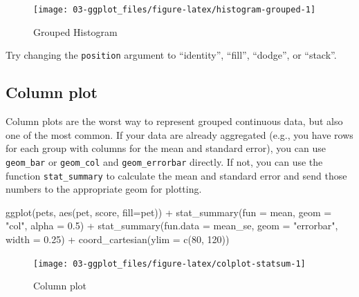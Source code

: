 \documentclass[
  oneside]{book}
\newenvironment{Shaded}{\begin{snugshade}}{\end{snugshade}}
\newcommand{\AttributeTok}[1]{\textcolor[rgb]{0.77,0.63,0.00}{#1}}
\newcommand{\DecValTok}[1]{\textcolor[rgb]{0.00,0.00,0.81}{#1}}
\newcommand{\FloatTok}[1]{\textcolor[rgb]{0.00,0.00,0.81}{#1}}
\newcommand{\FunctionTok}[1]{\textcolor[rgb]{0.00,0.00,0.00}{#1}}
\newcommand{\NormalTok}[1]{#1}
\newcommand{\SpecialCharTok}[1]{\textcolor[rgb]{0.00,0.00,0.00}{#1}}
\newcommand{\StringTok}[1]{\textcolor[rgb]{0.31,0.60,0.02}{#1}}
\begin{document}
\begin{figure}

{\centering \texttt{[image: 03-ggplot\_files/figure-latex/histogram-grouped-1]} 

}

\caption{Grouped Histogram}\label{fig:histogram-grouped}
\end{figure}

\begin{try}
Try changing the \texttt{position} argument to ``identity'', ``fill'', ``dodge'', or ``stack''.

\end{try}

\hypertarget{geom_col}{%
\subsection{Column plot}\label{geom_col}}

Column plots are the worst way to represent grouped continuous data, but also one of the most common. If your data are already aggregated (e.g., you have rows for each group with columns for the mean and standard error), you can use \texttt{geom\_bar} or \texttt{geom\_col} and \texttt{geom\_errorbar} directly. If not, you can use the function \texttt{stat\_summary} to calculate the mean and standard error and send those numbers to the appropriate geom for plotting.

\begin{Shaded}
\begin{Highlighting}[]
\FunctionTok{ggplot}\NormalTok{(pets, }\FunctionTok{aes}\NormalTok{(pet, score, }\AttributeTok{fill=}\NormalTok{pet)) }\SpecialCharTok{+}
  \FunctionTok{stat\_summary}\NormalTok{(}\AttributeTok{fun =}\NormalTok{ mean, }\AttributeTok{geom =} \StringTok{"col"}\NormalTok{, }\AttributeTok{alpha =} \FloatTok{0.5}\NormalTok{) }\SpecialCharTok{+} 
  \FunctionTok{stat\_summary}\NormalTok{(}\AttributeTok{fun.data =}\NormalTok{ mean\_se, }\AttributeTok{geom =} \StringTok{"errorbar"}\NormalTok{,}
               \AttributeTok{width =} \FloatTok{0.25}\NormalTok{) }\SpecialCharTok{+}
  \FunctionTok{coord\_cartesian}\NormalTok{(}\AttributeTok{ylim =} \FunctionTok{c}\NormalTok{(}\DecValTok{80}\NormalTok{, }\DecValTok{120}\NormalTok{))}
\end{Highlighting}
\end{Shaded}

\begin{figure}

{\centering \texttt{[image: 03-ggplot\_files/figure-latex/colplot-statsum-1]} 

}

\caption{Column plot}\label{fig:colplot-statsum}
\end{figure}
\end{document}

